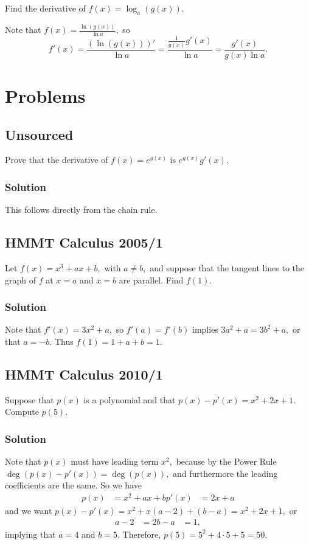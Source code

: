 \documentclass[mast]{lucky}
\begin{document}
\begin{exer}
Find the derivative of $f(x)=\log_a(g(x)).$
\end{exer}

\begin{sol}
Note that $f(x)=\frac{\ln(g(x))}{\ln a},$ so
\[f'(x)=\frac{(\ln(g(x)))'}{\ln a}=\frac{\frac{1}{g(x)}g'(x)}{\ln a}=\frac{g'(x)}{g(x)\ln a}.\]
\end{sol}

\pagebreak\section{Problems}

\subsection{Unsourced}

Prove that the derivative of $f(x)=e^{g(x)}$ is $e^{g(x)}g'(x).$

\subsubsection{Solution}
This follows directly from the chain rule.

\subsection{HMMT Calculus 2005/1}

Let $f(x)=x^3+ax+b,$ with $a\neq b,$ and suppose that the tangent lines to the graph of $f$ at $x=a$ and $x=b$ are parallel. Find $f(1).$

\subsubsection{Solution}
Note that $f'(x)=3x^2+a,$ so $f'(a)=f'(b)$ implies $3a^2+a=3b^2+a,$ or that $a=-b.$ Thus $f(1)=1+a+b=1.$


\subsection{HMMT Calculus 2010/1}

Suppose that $p(x)$ is a polynomial and that $p(x)-p'(x)=x^2+2x+1.$ Compute $p(5).$

\subsubsection{Solution}
Note that $p(x)$ must have leading term $x^2,$ because by the Power Rule $\deg(p(x)-p'(x))=\deg(p(x)),$ and furthermore the leading coefficients are the same. So we have
\begin{align*}
p(x)&=x^2+ax+b 
p'(x)&=2x+a
\end{align*}
and we want $p(x)-p'(x)=x^2+x(a-2)+(b-a)=x^2+2x+1,$ or
\begin{align*}
a-2&=2 
b-a&= 1,
\end{align*}
implying that $a=4$ and $b=5.$ Therefore, $p(5)=5^2+4\cdot 5+5=50.$
\end{document}
